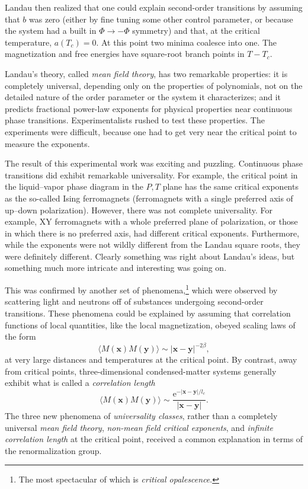 Landau then realized that one could explain second-order transitions by
assuming that $b$ was zero (either by fine tuning some other control
parameter, or because the system had a built in $\Phi\to-\Phi$ symmetry) and
that, at the critical temperature, $a(T_c)=0$. At this point two minima
coalesce into one. The magnetization and free energies have square-root branch
points in $T-T_c$.

Landau's theory, called \emph{mean field theory}, has two remarkable
properties: it is completely universal, depending only on the properties of
polynomials, not on the detailed nature of the order parameter or the system it
characterizes; and it predicts fractional power-law exponents for physical
properties near continuous phase transitions. Experimentalists rushed to test
these properties. The experiments were difficult, because one had to get very
near the critical point to measure the exponents.

The result of this experimental work was exciting and puzzling. Continuous
phase transitions did exhibit remarkable universality. For example, the
critical point in the liquid--vapor phase diagram in the $P,T$ plane has the
same critical exponents as the so-called Ising ferromagnets (ferromagnets with
a single preferred axis of up--down polarization). However, there was not
complete universality. For example, XY ferromagnets with a whole preferred
plane of polarization, or those in which there is no preferred axis, had
different critical exponents. Furthermore, while the exponents were not
wildly different from the Landau square roots, they were definitely different.
Clearly something was right about Landau's ideas, but something much more
intricate and interesting was going on.

This was confirmed by another set of phenomena,\footnote[5]{The most
spectacular of which is \emph{critical opalescence}.} which were observed by
scattering light and neutrons off of substances undergoing second-order
transitions. These phenomena could be explained by assuming that correlation
functions of local quantities, like the local magnetization, obeyed scaling
laws of the form
\[
  \langle M(\mathbf x)M(\mathbf y)\rangle\sim|\mathbf x-\mathbf y|^{-2\beta},
\]
at very large distances and temperatures at the critical point. By contrast,
away from critical points, three-dimensional condensed-matter systems
generally exhibit what is called a \emph{correlation length}
\[
  \langle M(\mathbf x)M(\mathbf y)\rangle\sim
  \frac{\mathrm{e}^{-|\mathbf x-\mathbf y|/l_c}}{|\mathbf x-\mathbf y|} .
\]
The three new phenomena of \emph{universality classes}, rather than a
completely universal \emph{mean field theory}, \emph{non-mean field critical
exponents}, and \emph{infinite correlation length} at the critical point,
received a common explanation in terms of the renormalization group.


